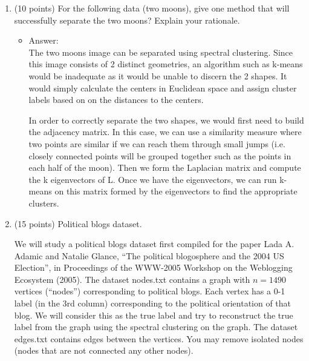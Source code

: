 \documentclass[twoside,10pt]{article}
\begin{document}
\begin{enumerate}

\item (10 points) For the following data (two moons), give one method that will successfully separate the two moons? Explain your rationale. 
\begin{itemize}
\item Answer:\\
The two moons image can be separated using spectral clustering. Since this image consists of 2 distinct geometries, an algorithm such as k-means would be inadequate as it would be unable to discern the 2 shapes. It would simply calculate the centers in Euclidean space and assign cluster labels based on on the distances to the centers. 

In order to correctly separate the two shapes, we would first need to build the adjacency matrix. In this case, we can use a similarity measure where two points are similar if we can reach them through small jumps (i.e. closely connected points will be grouped together such as the points in each half of the moon). Then we form the Laplacian matrix and compute the k eigenvectors of L. Once we have the eigenvectors, we can run k-means on this matrix formed by the eigenvectors to find the appropriate clusters.

\end{itemize}

\begin{center}
\end{center}



\item (15 points) Political blogs dataset. 

We will study a political blogs dataset first compiled for the paper Lada A. Adamic and Natalie Glance, ``The political blogosphere and the 2004 US Election'', in Proceedings of the WWW-2005 Workshop on the Weblogging Ecosystem (2005). The dataset \textsf{nodes.txt} contains a graph with $n = 1490$ vertices (``nodes'') corresponding to political blogs. Each vertex has a 0-1 label (in the 3rd column) corresponding to the political orientation of that blog. We will consider this as the true label and try to reconstruct the true label from the graph using the spectral clustering on the graph. The dataset \textsf{edges.txt} contains edges between the vertices. You may remove isolated nodes (nodes that are not connected any other nodes). 



\end{enumerate}
\end{document}
